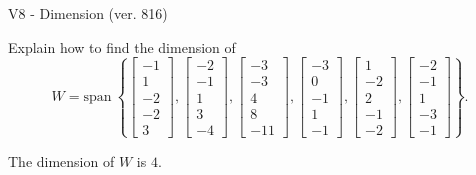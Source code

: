 \begin{exercise}
  \begin{exerciseTitle}V8 - Dimension (ver. 816)\end{exerciseTitle}
  \begin{exerciseStatement}
    Explain how to find the dimension of 
\[W=\mathrm{span}\ \left\{\left[\begin{array}{r}
-1 \\
1 \\
-2 \\
-2 \\
3
\end{array}\right] , \left[\begin{array}{r}
-2 \\
-1 \\
1 \\
3 \\
-4
\end{array}\right] , \left[\begin{array}{r}
-3 \\
-3 \\
4 \\
8 \\
-11
\end{array}\right] , \left[\begin{array}{r}
-3 \\
0 \\
-1 \\
1 \\
-1
\end{array}\right] , \left[\begin{array}{r}
1 \\
-2 \\
2 \\
-1 \\
-2
\end{array}\right] , \left[\begin{array}{r}
-2 \\
-1 \\
1 \\
-3 \\
-1
\end{array}\right]\right\}.\]



  \end{exerciseStatement}
  \begin{exerciseAnswer}
   The dimension of \(W\) is  \(4\).
  


  \end{exerciseAnswer}
\end{exercise}